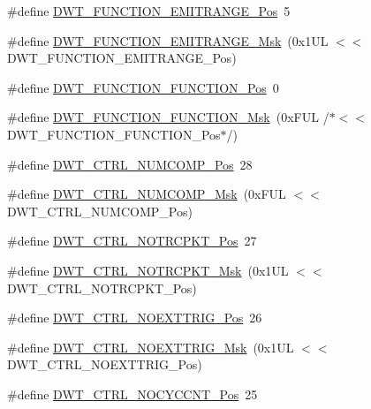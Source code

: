 \begin{DoxyCompactItemize}
\item 
\#define \hyperlink{group___c_m_s_i_s___d_w_t_ga41d5b332216baa8d29561260a1b85659}{D\+W\+T\+\_\+\+F\+U\+N\+C\+T\+I\+O\+N\+\_\+\+E\+M\+I\+T\+R\+A\+N\+G\+E\+\_\+\+Pos}~5
\item 
\#define \hyperlink{group___c_m_s_i_s___d_w_t_gad46dd5aba29f2e28d4d3f50b1d291f41}{D\+W\+T\+\_\+\+F\+U\+N\+C\+T\+I\+O\+N\+\_\+\+E\+M\+I\+T\+R\+A\+N\+G\+E\+\_\+\+Msk}~(0x1\+U\+L $<$$<$ D\+W\+T\+\_\+\+F\+U\+N\+C\+T\+I\+O\+N\+\_\+\+E\+M\+I\+T\+R\+A\+N\+G\+E\+\_\+\+Pos)
\item 
\#define \hyperlink{group___c_m_s_i_s___d_w_t_ga5797b556edde2bbaa4d33dcdb1a891bb}{D\+W\+T\+\_\+\+F\+U\+N\+C\+T\+I\+O\+N\+\_\+\+F\+U\+N\+C\+T\+I\+O\+N\+\_\+\+Pos}~0
\item 
\#define \hyperlink{group___c_m_s_i_s___d_w_t_ga3b2cda708755ecf5f921d08b25d774d1}{D\+W\+T\+\_\+\+F\+U\+N\+C\+T\+I\+O\+N\+\_\+\+F\+U\+N\+C\+T\+I\+O\+N\+\_\+\+Msk}~(0x\+F\+U\+L /$\ast$$<$$<$ D\+W\+T\+\_\+\+F\+U\+N\+C\+T\+I\+O\+N\+\_\+\+F\+U\+N\+C\+T\+I\+O\+N\+\_\+\+Pos$\ast$/)
\item 
\#define \hyperlink{group___c_m_s_i_s___d_w_t_gaac44b9b7d5391a7ffef129b7f6c84cd7}{D\+W\+T\+\_\+\+C\+T\+R\+L\+\_\+\+N\+U\+M\+C\+O\+M\+P\+\_\+\+Pos}~28
\item 
\#define \hyperlink{group___c_m_s_i_s___d_w_t_gaa3d37d68c2ba73f2026265584c2815e7}{D\+W\+T\+\_\+\+C\+T\+R\+L\+\_\+\+N\+U\+M\+C\+O\+M\+P\+\_\+\+Msk}~(0x\+F\+U\+L $<$$<$ D\+W\+T\+\_\+\+C\+T\+R\+L\+\_\+\+N\+U\+M\+C\+O\+M\+P\+\_\+\+Pos)
\item 
\#define \hyperlink{group___c_m_s_i_s___d_w_t_gaa82840323a2628e7f4a2b09b74fa73fd}{D\+W\+T\+\_\+\+C\+T\+R\+L\+\_\+\+N\+O\+T\+R\+C\+P\+K\+T\+\_\+\+Pos}~27
\item 
\#define \hyperlink{group___c_m_s_i_s___d_w_t_ga04d8bb0a065ca38e2e5f13a97e1f7073}{D\+W\+T\+\_\+\+C\+T\+R\+L\+\_\+\+N\+O\+T\+R\+C\+P\+K\+T\+\_\+\+Msk}~(0x1\+U\+L $<$$<$ D\+W\+T\+\_\+\+C\+T\+R\+L\+\_\+\+N\+O\+T\+R\+C\+P\+K\+T\+\_\+\+Pos)
\item 
\#define \hyperlink{group___c_m_s_i_s___d_w_t_gad997b9026715d5609b5a3b144eca42d0}{D\+W\+T\+\_\+\+C\+T\+R\+L\+\_\+\+N\+O\+E\+X\+T\+T\+R\+I\+G\+\_\+\+Pos}~26
\item 
\#define \hyperlink{group___c_m_s_i_s___d_w_t_gacc7d15edf7a27147c422099ab475953e}{D\+W\+T\+\_\+\+C\+T\+R\+L\+\_\+\+N\+O\+E\+X\+T\+T\+R\+I\+G\+\_\+\+Msk}~(0x1\+U\+L $<$$<$ D\+W\+T\+\_\+\+C\+T\+R\+L\+\_\+\+N\+O\+E\+X\+T\+T\+R\+I\+G\+\_\+\+Pos)
\item 
\#define \hyperlink{group___c_m_s_i_s___d_w_t_ga337f6167d960f57f12aa382ffecce522}{D\+W\+T\+\_\+\+C\+T\+R\+L\+\_\+\+N\+O\+C\+Y\+C\+C\+N\+T\+\_\+\+Pos}~25

\end{DoxyCompactItemize}
